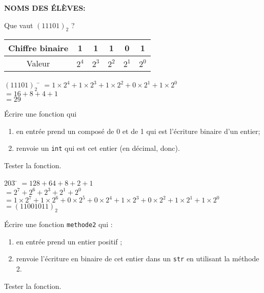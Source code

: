 \documentclass[a4paper,12pt,french]{book}
\begin{document}
\textbf{NOMS DES \'ELÈVES:}\\


\begin{methode}
Que vaut $(11101)_2$ ?
\begin{center}
	\begin{tabular}{|c|c|c|c|c|c|}
		\hline 
		Chiffre binaire & 1 & 1 & 1 & 0 & 1 \\ 
		\hline 
		Valeur & $2^4$ & $2^3$ & $2^2$ & $2^1$ & $2^0$ \\ 
		\hline 
	\end{tabular}
\end{center}
\begin{tabbing}
		$(11101)_2$	\= 	$=1\times 2^4+1\times 2^3+1\times 2^2+0\times 2^1+1\times 2^0$	\\
			\>	$=16+8+4+1$	\\	
			\>	$=29$	
	\end{tabbing}\nopagebreak
\end{methode}
\begin{exercice}[]
Écrire une fonction  qui
\begin{enumerate}[--]
	\item 	en entrée prend un  composé de 0 et de 1 qui est l'écriture binaire d'un entier;
	\item 	renvoie un \texttt{int} qui est cet entier (en décimal, donc).
\end{enumerate}
Tester la fonction.
\end{exercice}

\begin{methode}
\begin{tabbing}
	203	\= 	$=128+64+8+2+1$	\\
	
		\>	$=2^7+2^6+2^3+2^1+2^0$	\\
		
		\>	$=1\times 2^7+1\times 2^6+0\times 2^5 + 0\times 2^4 +1\times 2^3+0\times 2^2 + 1\times 
		2^1+1\times 2^0$	\\
		
		\> $=(11001011)_2$
\end{tabbing}
\end{methode}

\begin{exercice}[]
\'Ecrire une fonction \texttt{methode2} qui :
\begin{enumerate}[--]
	\item 	en entrée prend  un entier positif ;
	\item 	renvoie l'écriture en binaire de cet entier dans un \texttt{str} en utilisant la méthode 2.\\
\end{enumerate}
Tester la fonction.
\end{exercice}
\end{document}
